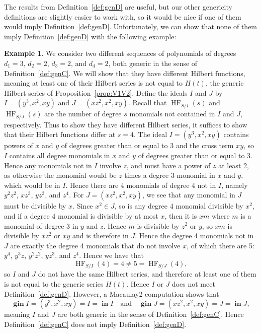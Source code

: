 \documentclass[11pt]{article}
\DeclareMathOperator{\Init}{\mathbf{in}}
\DeclareMathOperator{\HF}{HF}
\DeclareMathOperator{\gin}{\mathbf{gin}}
\theoremstyle{definition}
\newtheorem{example}{Example}
\begin{document}
The results from Definition~\ref{def:genD} are useful, but our other genericity definitions are slightly easier to work with, so it would be nice if one of them would imply Definition~\ref{def:genD}. Unfortunately, we can show that none of them imply Definition~\ref{def:genD} with the following example:


\begin{example}
	We consider two different sequences of polynomials of degrees $d_1 = 3$, $d_2 = 2$, $d_3 = 2$, and $d_4 = 2$, both generic in the sense of Definition~\ref{def:genC}. We will show that they have different Hilbert functions, meaning at least one of their Hilbert series is not equal to $H(t)$, the generic Hilbert series of Proposition~\ref{prop:V1V2}. Define the ideals $I$ and $J$ by $I = (y^3, x^2, xy)$ and $J = (xz^2, x^2, xy)$. Recall that $\HF_{S/I}(s)$ and $\HF_{S/J}(s)$ are the number of degree $s$ monomials not contained in $I$ and $J$, respectively. Thus to show they have different Hilbert series, it suffices to show that their Hilbert functions differ at $s = 4$. The ideal $I = (y^3, x^2, xy)$ contains powers of $x$ and $y$ of degrees greater than or equal to 3 and the cross term $xy$, so $I$ contains all degree monomials in $x$ and $y$ of degrees greater than or equal to 3. Hence any monomials not in $I$ involve $z$, and must have a power of $z$ at least 2, as otherwise the monomial would be $z$ times a degree 3 monomial in $x$ and $y$, which would be in $I$. Hence there are 4 monomials of degree 4 not in $I$, namely $y^2 z^2$, $xz^3$, $yz^3$, and $z^4$. For $J = (xz^2, x^2, xy)$, we see that any monomial in $J$ must be divisible by $x$. Since $x^2 \in J$, so is any degree 4 monomial divisible by $x^2$, and if a degree 4 monomial is divisible by at most $x$, then it is $xm$ where $m$ is a monomial of degree 3 in $y$ and $z$. Hence $m$ is divisible by $z^2$ or $y$, so $xm$ is divisible by $xz^2$ or $xy$ and is therefore in $J$. Hence the degree 4 monomials not in $J$ are exactly the degree 4 monomials that do not involve $x$, of which there are 5: $y^4$, $y^3z$, $y^2z^2$, $yz^3$, and $z^4$. Hence we have that \[ \HF_{S/I}(4) = 4 \neq 5 = \HF_{S/J}(4), \] so $I$ and $J$ do not have the same Hilbert series, and therefore at least one of them is not equal to the generic series $H(t)$. Hence $I$ or $J$ does not meet Definition~\ref{def:genD}. However, a Macaulay2 computation shows that \[ \gin I = (y^3, x^2, xy) = I = \Init I \quad \text{and} \quad \gin J = (xz^2, x^2, xy) = J = \Init J, \] meaning $I$ and $J$ are both generic in the sense of Definition~\ref{def:genC}. Hence Definition~\ref{def:genC} does not imply Definition~\ref{def:genD}.
\end{example}
\end{document}
